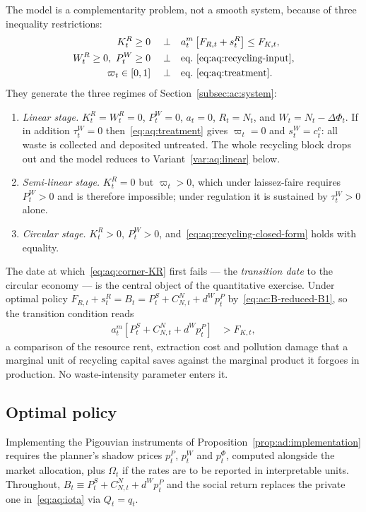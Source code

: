 The model is a complementarity problem, not a smooth system, because of three inequality restrictions:
\begin{align}
K^R_t\ge 0 \quad\perp\quad
&a^m_t\left[F_{R,t}+s^R_t\right]\le F_{K,t},
\label{eq:aq:corner-KR}
\\
W^R_t\ge 0,\ P^W_t\ge 0 \quad\perp\quad
&\text{eq.~\eqref{eq:aq:recycling-input}},
\label{eq:aq:corner-WR}
\\
\varpi_t\in[0,1] \quad\perp\quad
&\text{eq.~\eqref{eq:aq:treatment}}.
\label{eq:aq:corner-varpi}
\end{align}
They generate the three regimes of Section~\ref{subsec:ac:system}:
\begin{enumerate}[label=(\roman*),leftmargin=2.4em]
\item \emph{Linear stage.} $K^R_t=W^R_t=0$, $P^W_t=0$, $a_t=0$, $R_t=N_t$, and $W_t=N_t-\Delta\Phi_t$. If in addition $\tau^W_t=0$ then~\eqref{eq:aq:treatment} gives $\varpi_t=0$ and $s^W_t=c^c_t$: all waste is collected and deposited untreated. The whole recycling block drops out and the model reduces to Variant~\ref{var:aq:linear} below.
\item \emph{Semi-linear stage.} $K^R_t=0$ but $\varpi_t>0$, which under laissez-faire requires $P^W_t>0$ and is therefore impossible; under regulation it is sustained by $\tau^W_t>0$ alone.
\item \emph{Circular stage.} $K^R_t>0$, $P^W_t>0$, and~\eqref{eq:aq:recycling-closed-form} holds with equality.
\end{enumerate}
The date at which~\eqref{eq:aq:corner-KR} first fails --- the \emph{transition date} to the circular economy --- is the central object of the quantitative exercise. Under optimal policy $F_{R,t}+s^R_t=B_t=P^S_t+C^N_{N,t}+d^Wp^P_t$ by~\eqref{eq:ac:B-reduced-B1}, so the transition condition reads
\begin{align}
a^m_t\left[P^S_t+C^N_{N,t}+d^Wp^P_t\right] &> F_{K,t},
\label{eq:aq:transition}
\end{align}
a comparison of the resource rent, extraction cost and pollution damage that a marginal unit of recycling capital saves against the marginal product it forgoes in production. No waste-intensity parameter enters it.

\subsection{Optimal policy}
\label{subsec:aq:optimal-policy}

Implementing the Pigouvian instruments of Proposition~\ref{prop:ad:implementation} requires the planner's shadow prices $p^P_t$, $p^W_t$ and $p^\Phi_t$, computed alongside the market allocation, plus $\Omega_t$ if the rates are to be reported in interpretable units. Throughout, $B_t\equiv P^S_t+C^N_{N,t}+d^Wp^P_t$ and the social return replaces the private one in~\eqref{eq:aq:iota} via $Q_t=q_t$.

